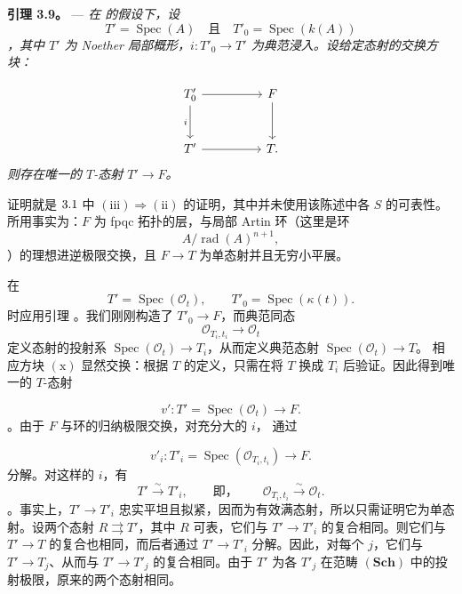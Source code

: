 \medskip\noindent{}\textbf{引理 3.9。} --- \textit{在  的假设下，设 \[
  T'=\operatorname{Spec}(A)
  \quad\text{且}\quad
  T'_0=\operatorname{Spec}(k(A))
\]，其中 \(T'\) 为 Noether 局部概形，\(i:T'_0\to T'\) 为典范浸入。设给定态射的交换方块：}

 \[
\begin{tikzcd}[column sep=huge,row sep=large]
  T'_0 \arrow[r] \arrow[d,"i"'] & F \arrow[d] \\
  T' \arrow[r] & T .
\end{tikzcd}
\]\textit{则存在唯一的 \(T\)-态射 \(T'\to F\)。}

证明就是 \(\SGARefLink{sga3:xi:proposition:3:1}{3.1}\) 中 \((\mathrm{iii})\Rightarrow
(\mathrm{ii})\) 的证明，其中并未使用该陈述中各 \(S\) 的可表性。所用事实为：\(F\) 为 fpqc 拓扑的层，与局部 Artin 环（这里是环 \[
  A/\operatorname{rad}(A)^{n+1},
\]）的理想进逆极限交换，且 \(F\to T\) 为单态射并且无穷小平展。

在 \[
  T'=\operatorname{Spec}(\mathscr O_t),
  \qquad
  T'_0=\operatorname{Spec}(\kappa(t)).
\] 时应用引理 。我们刚刚构造了 \(T'_0\to F\)，而典范同态 \[
  \mathscr O_{T_i,t_i}\longrightarrow\mathscr O_t
\] 定义态射的投射系 \(\operatorname{Spec}(\mathscr O_t)\to T_i\)，从而定义典范态射 \(\operatorname{Spec}(\mathscr O_t)\to T\)。 相应方块 \(\mathrm{(x)}\) 显然交换：根据 \(T\) 的定义，只需在将 \(T\) 换成 \(T_i\) 后验证。因此得到唯一的 \(T\)-态射

 \[
  v':T'=\operatorname{Spec}(\mathscr O_t)\longrightarrow F.
\]。由于 \(F\) 与环的归纳极限交换，对充分大的 \(i\)， 通过

 \[
  v'_i:T'_i=\operatorname{Spec}(\mathscr O_{T_i,t_i})
  \longrightarrow F.
\] 分解。对这样的 \(i\)，有  \[
  T'\xrightarrow{\sim}T'_i,
  \qquad\text{即，}\qquad
  \mathscr O_{T_i,t_i}\xrightarrow{\sim}\mathscr O_t.
\]。事实上，\(T'\to T'_i\) 忠实平坦且拟紧，因而为有效满态射，所以只需证明它为单态射。设两个态射 \(R\rightrightarrows T'\)，其中 \(R\) 可表，它们与 \(T'\to T'_i\) 的复合相同。则它们与 \(T'\to T\) 的复合也相同，而后者通过 \(T'\to T'_i\) 分解。因此，对每个 \(j\)，它们与 \(T'\to T_j\)、从而与 \(T'\to T'_j\) 的复合相同。由于 \(T'\) 为各 \(T'_j\) 在范畴 \((\mathbf{Sch})\) 中的投射极限，原来的两个态射相同。

